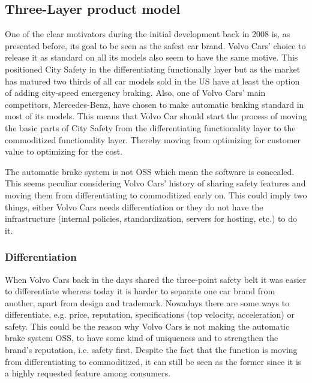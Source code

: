 \documentclass[conference]{IEEEtran}
\begin{document}
\subsection{Three-Layer product model}
One of the clear motivators during the initial development back in 2008 is, as presented before, its goal to be seen as the safest car brand. Volvo Cars' choice to release it as standard on all its models also seem to have the same motive. This positioned City Safety in the differentiating functionally layer but as the market has matured two thirds of all car models sold in the US have at least the option of adding city-speed emergency braking. Also, one of Volvo Cars' main competitors, Mercedes-Benz, have chosen to make automatic braking standard in most of its models.  \cite{AEBStatistics} This means that Volvo Car should start the process of moving the basic parts of City Safety from the differentiating functionality layer to the commoditized functionality layer. Thereby moving from optimizing for customer value to optimizing for the cost.

The automatic brake system is not OSS which mean the software is concealed. This seems peculiar considering Volvo Cars' history of sharing safety features and moving them from differentiating to commoditized early on. This could imply two things, either Volvo Cars needs differentiation or they do not have the infrastructure (internal policies, standardization, servers for hosting, etc.) to do it.

\subsubsection{Differentiation}
When Volvo Cars back in the days shared the three-point safety belt it was easier to differentiate whereas today it is harder to separate one car brand from another, apart from design and trademark. Nowadays there are some ways to differentiate, e.g. price, reputation, specifications (top velocity, acceleration) or safety. This could be the reason why Volvo Cars is not making the automatic brake system OSS, to have some kind of uniqueness and to strengthen the brand's reputation, i.e. safety first. Despite the fact that the function is moving from differentiating to commoditized, it can still be seen as the former since it is a highly requested feature among consumers. \cite{AEBStatistics,VolvoVision}
\end{document}
